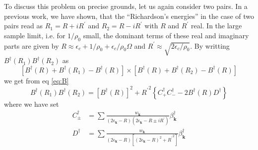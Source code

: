 \documentclass[aps,prb,superscriptaddress,showpacs,reprint,lengthcheck]{revtex4-1}
\newcommand{\vk}{\ensuremath{\mathbf{k}}}
\begin{document}
To discuss this problem on precise grounds, let us again consider two pairs. In
a previous work\cite{combescotBCS}, we have shown, that the ``Richardson's
energies'' in the case of two pairs read as $R_1=R+iR^{\prime}$ and $R_2=R-i{}R^{\prime}$ with $R$
and $R^{\prime}$ real. In the
large sample limit, i.e. for $1/\rho_0$ small,  the dominant terms of these real and imaginary parts are given by $R\approx\epsilon_c+1/%
\rho_0+\epsilon_c/\rho_0\Omega$ and $R^{\prime}\approx\sqrt{2\epsilon_c/\rho_0}$. By writting $B^{\dagger}(R_1)B^{\dagger}(R_2)$ as 
\begin{equation}
\left[B^{\dagger}(R)+B^{\dagger}(R_1)-B^{\dagger}(R)\right]\times \left[%
B^{\dagger}(R)+B^{\dagger}(R_2)-B^{\dagger}(R)\right] 
\end{equation}
we get from eq \eqref{eq:B} 
\begin{equation}
B^{\dagger}(R_1)B^{\dagger}(R_2)=\left[B^{\dagger}(R)\right]
^2+{R^{\prime}}^2\left\{C^{\dagger}_+C^{\dagger}_--2B^{\dagger}(R)D^{\dagger}%
\right\} 
\end{equation}
where we have set 
\begin{align}
C^{\dagger}_{\pm}&=\sum\frac{w_\vk}{\left(2\epsilon_\vk-R\right)
\left(2\epsilon_\vk-R\pm{}iR^{\prime}\right) }\beta^{\dagger}_\vk \\
D^{\dagger}&=\sum\frac{w_\vk}{\left(2\epsilon_\vk-R\right) \left[%
\left(2\epsilon_\vk-R\right) ^2+{}{R^{\prime}}^2\right] }\beta^{\dagger}_\vk
\end{align}
\end{document}
